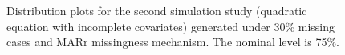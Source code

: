 \begin{figure}
\begin{center}
{{					}
				}
			\end{center}
			\caption{Distribution plots for the second simulation study (quadratic equation with incomplete covariates) generated under 30\% missing cases and MARr missingness mechanism. The nominal level is 75\%.}
			\label{fig6_6}
	
	\end{figure}
	
